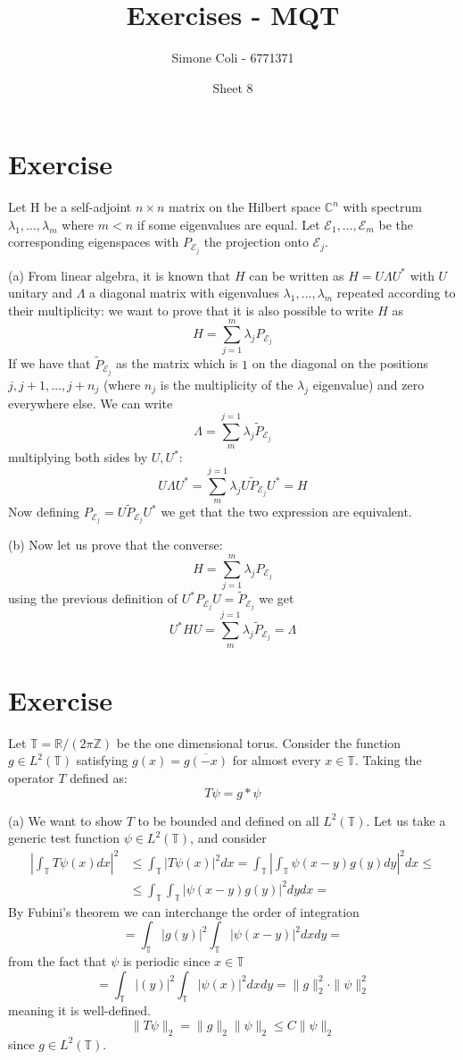 \documentclass{article}
\title{Exercises - MQT}
\author{Simone Coli - 6771371}
\date{Sheet 8}
\newcommand{\R}{\mathbb{R}}
\newcommand{\C}{\mathbb{C}}
\newcommand{\T}{\mathbb{T}}
\newcommand{\Z}{\mathbb{Z}}
\begin{document}
\maketitle

\section{Exercise}
Let H be a self-adjoint $n\times n$ matrix on the Hilbert space $\C^n$ with spectrum $\lambda_1, \dots, \lambda_m$ where $m <n$ if some eigenvalues are equal. Let $\mathcal{E}_1, \dots, \mathcal{E}_m$ be the corresponding eigenspaces with $P_{\mathcal{E}_j}$ the projection onto $\mathcal{E}_j$.

(a) From linear algebra, it is known that $H $ can be written as $H = U \Lambda U^*$ with $U$ unitary and $\Lambda$ a diagonal matrix with eigenvalues $\lambda_1, \dots, \lambda_m$ repeated according to their multiplicity: we want to prove that it is also possible to write $H$ as
\[
    H = \sum_{j = 1}^{m} \lambda_j P_{\mathcal{E}_j}
\]
If we have that $\widetilde{P}_{\mathcal{E}_j}$ as the matrix which is $1$ on the diagonal on the positions $j, j+1, \dots, j + n_j$ (where $n_j$ is the multiplicity of the $\lambda_j$ eigenvalue) and zero everywhere else. We can write
\[
    \Lambda = \sum_{m}^{j=1} \lambda_j \widetilde{P}_{\mathcal{E}_j}
\]
multiplying both sides by $U, U^*$:
\[
    U \Lambda U^* = \sum_{m}^{j=1} \lambda_j U \widetilde{P}_{\mathcal{E}_j}U^* = H
\]
Now defining $P_{\mathcal{E}_j} = U \widetilde{P}_{\mathcal{E}_j} U^*$ we get that the two expression are equivalent.

(b) Now let us prove that the converse:
\[
    H = \sum_{j=1}^{m} \lambda_j P_{\mathcal{E}_j}
\]
using the previous definition of $ U^* P_{\mathcal{E}_j} U = \widetilde{P}_{\mathcal{E}_j}$ we get
\[
    U^* H U = \sum_{m}^{j=1} \lambda_j \widetilde{P}_{\mathcal{E}_j} = \Lambda
\]
\section{Exercise}

Let $\mathbb T = \R / (2\pi \Z)$ be the one dimensional torus. Consider the function $g \in L^2(\mathbb T)$  satisfying $g(x) = \overline{g(-x)}$ for almost every $x \in \mathbb T$. Taking the operator $T$ defined as:
\[
    T \psi = g*\psi
\]

(a) We want to show $T$ to be bounded and defined on all $L^2(\mathbb T)$. Let us take a generic test function $\psi \in L^2 (\mathbb T)$, and consider
\[
    \begin{split}
        \left| \int_\T T \psi(x) dx \right|^2 &\leq \int_\T |T\psi(x)|^2 dx = \int_\T \left| \int_\T \psi(x-y) g(y) dy \right|^2 dx \leq \\
        & \leq \int_\T \int_\T |\psi(x-y) g(y)|^2 dy dx =
    \end{split}
\]
By Fubini's theorem we can interchange the order of integration
\[
    = \int_\T |g(y)|^2 \int_\T |\psi(x-y)|^2 dx dy = 
\]
from the fact that $\psi$ is periodic since $x \in \T$
\[
    = \int_\T |(y)|^2 \int_\T |\psi(x)|^2 dx dy = \| g \|_2^2 \cdot\| \psi \|_2^2
\]
meaning it is well-defined. 
\[
    \| T \psi\|_2 = \| g \|_2 \|\psi \|_2 \leq C \|\psi\|_2 
\]
since $g \in L^2(\T)$.
\end{document}

